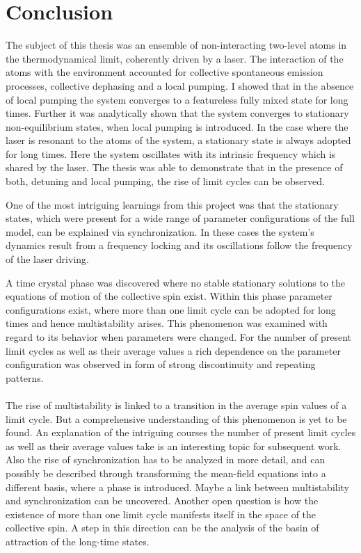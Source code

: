 \chapter{Conclusion}
The subject of this thesis was an ensemble of non-interacting two-level atoms in the thermodynamical limit, coherently driven by a laser. The interaction of the atoms with the environment accounted for collective spontaneous emission processes, collective dephasing and a local pumping. I showed that in the absence of local pumping the system converges to a featureless fully mixed state for long times. Further it was analytically shown that the system converges to stationary non-equilibrium states, when local pumping is introduced. In the case where the laser is resonant to the atoms of the system, a stationary state is always adopted for long times. Here the system oscillates with its intrinsic frequency which is shared by the laser. The thesis was able to demonstrate that in the presence of both, detuning and local pumping, the rise of limit cycles can be observed.%

One of the most intriguing learnings from this project was that the stationary states, which were present for a wide range of parameter configurations of the full model, can be explained via synchronization. In these cases the system's dynamics result from a frequency locking and its oscillations follow the frequency of the laser driving. 

A time crystal phase was discovered where no stable stationary solutions to the equations of motion of the collective spin exist. Within this phase parameter configurations exist, where more than one limit cycle can be adopted for long times and hence multistability arises. This phenomenon was examined with regard to its behavior when parameters were changed. For the number of present limit cycles as well as their average values a rich dependence on the parameter configuration was observed in form of strong discontinuity and repeating patterns.\\\\
The rise of multistability is linked to a transition in the average spin values of a limit cycle. But a comprehensive understanding of this phenomenon is yet to be found. An explanation of the intriguing courses the number of present limit cycles as well as their average values take is an interesting topic for subsequent work. Also the rise of synchronization has to be analyzed in more detail, and can possibly be described through transforming the mean-field equations into a different basis, where a phase is introduced. Maybe a link between multistability and synchronization can be uncovered. Another open question is how the existence of more than one limit cycle manifests itself in the space of the collective spin. A step in this direction can be the analysis of the basin of attraction of the long-time states.

